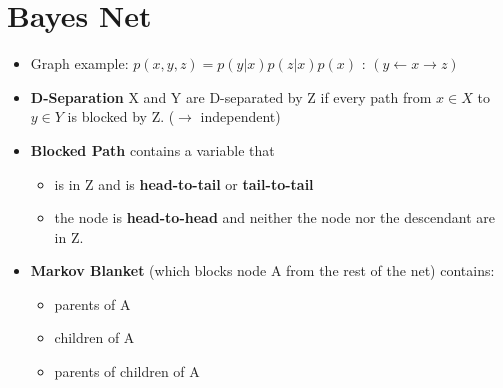 
\section{Bayes Net}
\begin{itemize}
	\item Graph example: $p(x, y, z) = p(y | x) p(z | x) p(x)$ : $(y \leftarrow x \rightarrow z)$ 
	\item \textbf{D-Separation} X and Y are D-separated by Z if every path from $ x \in X$ to $y \in Y$ is blocked by Z. ($\rightarrow$ independent)
	\item \textbf{Blocked Path} contains a variable that
	\begin{itemize}
		\item is in Z and is \textbf{head-to-tail} or \textbf{tail-to-tail}
		\item the node is \textbf{head-to-head} and neither the node nor the descendant are in Z.
	\end{itemize}	
	\item \textbf{Markov Blanket} (which blocks node A from the rest of the net) contains:
	\begin{itemize}
		\item parents of A
		\item children of A
		\item parents of children of A
	\end{itemize}
	
\end{itemize}






